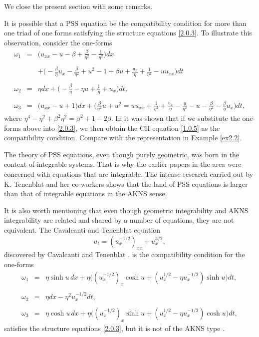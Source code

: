 \documentclass{cimart}
\newcommand{\ba}{\begin{array}}
\newcommand{\ea}{\end{array}}
\begin{document}
We close the present section with some remarks.

\begin{remark}
It is possible that a PSS equation be the compatibility condition for more than one triad of one forms satisfying the structure equations \eqref{2.0.3}. To illustrate this observation, consider the one-forms
$$
\ba{lcl}
\omega_1&=&{\Big(u_{xx}-u-\beta+\frac{\beta}{\eta^2}-\frac{1}{\eta^2}\Big)dx}\\
\\
&&+{\Big(-\frac{\beta}{\eta}u_x-\frac{\beta}{\eta^2}+u^2-1+\beta u+\frac{u_x}{\eta}+\frac{1}{\eta^2}-uu_{xx}\Big)dt}\\
\\
\omega_2&=&{\eta dx+\Big(-\frac{\beta}{\eta}-\eta u+\frac{1}{\eta}+u_x\Big)dt},\\
\\
\omega_3&=&{\Big(u_{xx}-u+1\Big)dx+\Big(\frac{\beta}{\eta^2}u+u^2=uu_{xx}+\frac{1}{\eta^2}+\frac{u_x}{\eta}-\frac{u}{\eta^2}-u-\frac{\beta}{\eta^2}-\frac{\beta}{\eta}u_x\Big)dt},
\ea
$$
where $\eta^4-\eta^2+\beta^2\eta^2=\beta^2+1-2\beta$. In \cite[Theorem 1]{reyes2002} it was shown that if we substitute the one-forms above into \eqref{2.0.3}, we then obtain the CH equation \eqref{1.0.5} as the compatibility condition. Compare with the representation in  Example \ref{ex2.2}.
\end{remark}

\begin{remark}
The theory of PSS equations, even though purely geometric, was born in the context of integrable systems. That is why the earlier papers in the area were concerned with equations that are integrable. The intense research carried out by K. Tenenblat and her co-workers shows that the land of PSS equations is larger than that of integrable equations in the AKNS sense. 

It is also worth mentioning that even though geometric integrability and AKNS integrability are related and shared by a number of equations, they are not equivalent. The Cavalcanti and Tenenblat equation
$$
u_t=(u_x^{-1/2})_{xx}+u_x^{3/2},
$$
discovered by Cavalcanti and Tenenblat \cite{cat}, is the compatibility condition for the one-forms
$$
\ba{lcl}
\omega_1&=&\eta\sinh{u}\,dx+\eta\Big((u_x ^{-1/2})_x\cosh{u}+(u_x^{1/2}-\eta u_x^{-1/2})\sinh{u}\Big)dt,\\
\\
\omega_2&=&\eta dx-\eta^2u_x^{-1/2}dt,\\
\\
\omega_3&=&\eta\cosh{u}\,dx+\eta\Big((u_x ^{-1/2})_x\sinh{u}+(u_x^{1/2}-\eta u_x^{-1/2})\cosh{u}\Big)dt,
\ea
$$
satisfies the structure equations \eqref{2.0.3}, but it is not of the AKNS type \cite[page 79]{reyes2000}.
\end{remark}
\end{document}
